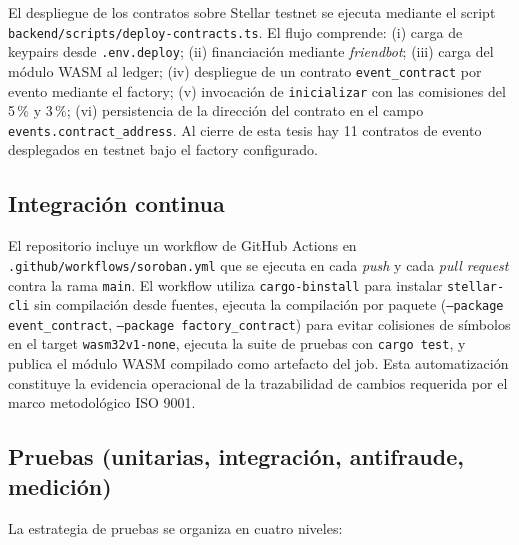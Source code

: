 El despliegue de los contratos sobre Stellar testnet se ejecuta mediante el script \texttt{backend/scripts/deploy-contracts.ts}. El flujo comprende: (i) carga de keypairs desde \texttt{.env.deploy}; (ii) financiación mediante \textit{friendbot}; (iii) carga del módulo WASM al ledger; (iv) despliegue de un contrato \texttt{event\_contract} por evento mediante el factory; (v) invocación de \texttt{inicializar} con las comisiones del 5\,\% y 3\,\%; (vi) persistencia de la dirección del contrato en el campo \texttt{events.contract\_address}. Al cierre de esta tesis hay 11 contratos de evento desplegados en testnet bajo el factory configurado.

\subsection{Integración continua}

El repositorio incluye un workflow de GitHub Actions en \texttt{.github/workflows/soroban.yml} que se ejecuta en cada \textit{push} y cada \textit{pull request} contra la rama \texttt{main}. El workflow utiliza \texttt{cargo-binstall} para instalar \texttt{stellar-cli} sin compilación desde fuentes, ejecuta la compilación por paquete (\texttt{--package event\_contract}, \texttt{--package factory\_contract}) para evitar colisiones de símbolos en el target \texttt{wasm32v1-none}, ejecuta la suite de pruebas con \texttt{cargo test}, y publica el módulo WASM compilado como artefacto del job. Esta automatización constituye la evidencia operacional de la trazabilidad de cambios requerida por el marco metodológico ISO 9001.

\subsection{Pruebas (unitarias, integración, antifraude, medición)}

La estrategia de pruebas se organiza en cuatro niveles:

